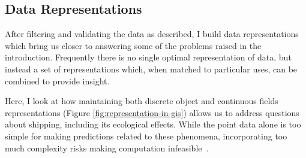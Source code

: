 

\subsection{Data Representations}


After filtering and validating the data as described, I build data representations which bring us closer to answering some of the problems raised in the introduction. Frequently there is no single optimal representation of data, but instead a set of representations which, when matched to particular uses, can be combined to provide insight.

Here, I look at how maintaining both discrete object and continuous fields representations (Figure \ref{fig:representation-in-gis}) allows us to address questions about shipping, including its ecological effects. While the point data alone is too simple for making predictions related to these phenomena, incorporating too much complexity risks making computation infeasible~\citep{de2007geospatial}.





